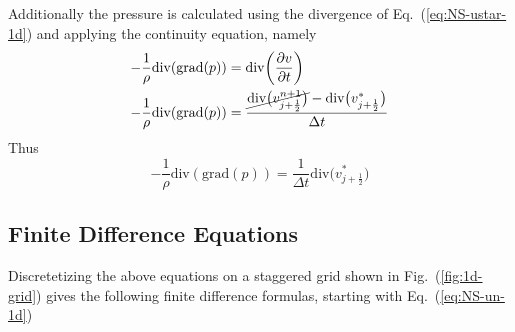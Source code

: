\documentclass[12pt]{article}
\begin{document}
Additionally the pressure is calculated using the divergence of
Eq.~(\ref{eq:NS-ustar-1d}) and applying the continuity equation, namely  
\begin{subequations}
    \begin{align}
        -\frac{1}{\rho} \text{div}(\text{grad}(p)) & =
                \text{div}\bigg(\pdv{v}{t}\bigg)        \\
        -\frac{1}{\rho} \text{div}(\text{grad}(p)) & =
            \frac{
                    \cancel{\text{div}\big(v^{n+1}_{j+\frac{1}{2}}\big)} -
                    \text{div}\big(v^{\ast}_{j+\frac{1}{2}}\big)
                }
                {\Delta t}
    \end{align}
\end{subequations}
Thus
\begin{equation}
    -\frac{1}{\rho} \text{div}(\text{grad}(p)) =
        \frac{1}{\Delta t} \text{div} \big(v^{\ast}_{j+\frac{1}{2}}\big)
\end{equation}
\newpage
\subsection{Finite Difference Equations}
Discretetizing the above equations on a staggered grid shown in
Fig.~(\ref{fig:1d-grid}) gives the following finite difference formulas,
starting with Eq.~(\ref{eq:NS-un-1d})
\end{document}
